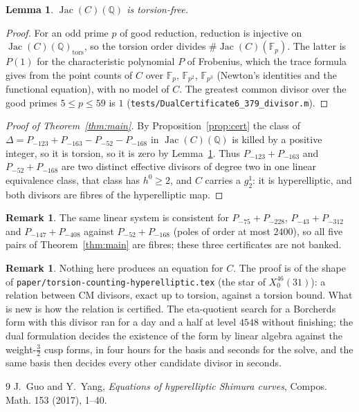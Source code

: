 \documentclass[11pt,reqno]{amsart}
\theoremstyle{plain}
\newtheorem{lemma}[theorem]{Lemma}
\theoremstyle{definition}
\newtheorem{remark}[theorem]{Remark}
\DeclareMathOperator{\Jac}{Jac}
\newcommand{\Q}{\mathbb{Q}}
\newcommand{\F}{\mathbb{F}}
\begin{document}
\begin{lemma}\label{lem:tors}
$\Jac(C)(\Q)$ is torsion-free.
\end{lemma}

\begin{proof}
For an odd prime $p$ of good reduction, reduction is injective on $\Jac(C)(\Q)_{\mathrm{tors}}$,
so the torsion order divides $\#\Jac(C)(\F_p)$. The latter is $P(1)$ for the characteristic
polynomial $P$ of Frobenius, which the trace formula gives from the point counts of $C$ over
$\F_p$, $\F_{p^2}$, $\F_{p^3}$ (Newton's identities and the functional equation), with no model of
$C$. The greatest common divisor over the good primes $5\le p\le59$ is $1$
(\texttt{tests/DualCertificate6\_379\_divisor.m}).
\end{proof}

\begin{proof}[Proof of Theorem~\ref{thm:main}]
By Proposition~\ref{prop:cert} the class of $\Delta=P_{-123}+P_{-163}-P_{-52}-P_{-168}$ in
$\Jac(C)(\Q)$ is killed by a positive integer, so it is torsion, so it is zero by
Lemma~\ref{lem:tors}. Thus $P_{-123}+P_{-163}$ and $P_{-52}+P_{-168}$ are two distinct effective
divisors of degree two in one linear equivalence class, that class has $h^0\ge2$, and $C$ carries
a $g^1_2$: it is hyperelliptic, and both divisors are fibres of the hyperelliptic map.
\end{proof}

\begin{remark}\label{rem:others}
The same linear system is consistent for $P_{-75}+P_{-228}$, $P_{-43}+P_{-312}$ and
$P_{-147}+P_{-408}$ against $P_{-52}+P_{-168}$ (poles of order at most $2400$), so all five
pairs of Theorem~\ref{thm:main} are fibres; these three certificates are not banked.
\end{remark}

\begin{remark}
Nothing here produces an equation for $C$. The proof is of the shape of \texttt{paper/torsion-counting-hyperelliptic.tex} (the star of $X_0^{46}(31)$): a relation between CM divisors, exact up to torsion, against a torsion bound. What is new is how the relation is certified. The eta-quotient search for a Borcherds form with this divisor ran for a day and a half at level $4548$ without finishing; the dual formulation decides the existence of the form by linear algebra against the weight-$\tfrac32$ cusp forms, in four hours for the basis and seconds for the solve, and the same basis then decides every other candidate divisor in seconds.
\end{remark}

\begin{thebibliography}{9}
 J.~Guo and Y.~Yang, \emph{Equations of hyperelliptic Shimura curves}, Compos. Math.
153 (2017), 1–40.
\end{thebibliography}
\end{document}
